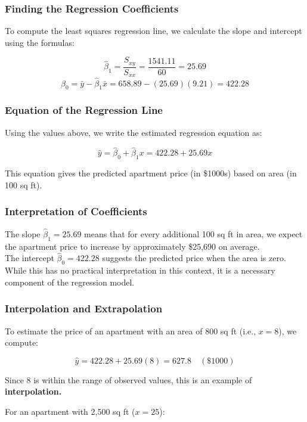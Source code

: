 \begin{example}
\subsubsection*{Finding the Regression Coefficients}

To compute the least squares regression line, we calculate the slope and intercept using the formulas:

\[
\hat{\beta}_1 = \frac{S_{xy}}{S_{xx}} = \frac{1541.11}{60} = 25.69
\]
\[
\hat{\beta}_0 = \bar{y} - \hat{\beta}_1 \bar{x} = 658.89 - (25.69)(9.21) = 422.28
\]

\subsubsection*{Equation of the Regression Line}

Using the values above, we write the estimated regression equation as:

\[
\hat{y} = \hat{\beta}_0 + \hat{\beta}_1 x = 422.28 + 25.69x
\]

This equation gives the predicted apartment price (in \$1000s) based on area (in 100 sq ft).

\subsubsection*{Interpretation of Coefficients}

The slope $\hat{\beta}_1 = 25.69$ means that for every additional 100 sq ft in area, we expect the apartment price to increase by approximately \$25,690 on average.\\
The intercept $\hat{\beta}_0 = 422.28$ suggests the predicted price when the area is zero. While this has no practical interpretation in this context, it is a necessary component of the regression model.

\subsubsection*{Interpolation and Extrapolation}

To estimate the price of an apartment with an area of 800 sq ft (i.e., $x = 8$), we compute:

\[
\hat{y} = 422.28 + 25.69(8) = 627.8 \quad (\$1000)
\]

Since 8 is within the range of observed values, this is an example of \textbf{interpolation.}

For an apartment with 2,500 sq ft ($x = 25$):


\end{example}
